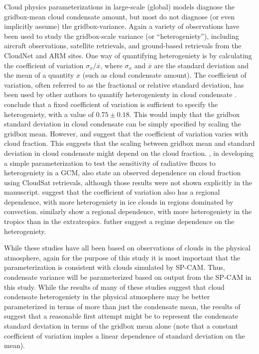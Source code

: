 Cloud physics parameterizations in large-scale (global) models diagnose
the gridbox-mean cloud condensate amount, but most do not diagnose (or
even implicitly assume) the gridbox-variance. Again a variety of
observations have been used to study the gridbox-scale variance (or
``heterogeniety''), including aircraft observations, satellite
retrievals, and ground-based retrievals from the CloudNet and ARM sites.
One way of quantifying heterogeniety is by calculating the coefficient
of variation \(\sigma_x / \overline{x}\), where \(\sigma_x\) and
\(\overline{x}\) are the standard deviation and the mean of a quantity
\(x\) (such as cloud condensate amount). The coefficient of variation,
often referred to as the fractional or relative standard deviation, has
been used by other authors to quantify heterogenienty in cloud
condensate
\citep{hogan_and_illingworth_2003, shonk_et_al_2010, hill_et_al_2012, boutle_et_al_2014}.
\citet{shonk_et_al_2010} conclude that a fixed coefficient of variation
is sufficient to specify the heterogeniety, with a value of
\(0.75 \pm 0.18\). This would imply that the gridbox standard deviation
in cloud condensate can be simply specified by scaling the gridbox mean.
However, \citet{hill_et_al_2012} and \citet{boutle_et_al_2014} suggest
that the coefficient of variation varies with cloud fraction. This
suggests that the scaling between gridbox mean and standard deviation in
cloud condensate might depend on the cloud fraction.
\citet{oreopoulos_et_al_2012}, in developing a simple parameterization
to test the sensitivity of radiative fluxes to heterogeniety in a GCM,
also state an observed dependence on cloud fraction using CloudSat
retrievals, although those results were not shown explicitly in the
manuscript. \citet{hill_et_al_2015} suggest that the coefficient of
variation also has a regional dependence, with more heterogeniety in ice
clouds in regions dominated by convection. \citet{lebsock_et_al_2013}
similarly show a regional dependence, with more heterogeniety in the
tropics than in the extratropics. \citet{ahlgrimm_and_forbes_2016}
futher suggest a regime dependence on the heterogeniety.

While these studies have all been based on observations of clouds in the
physical atmosphere, again for the purpose of this study it is most
important that the parameterization is consistent with clouds simulated
by SP-CAM. Thus, condensate variance will be parameterized based on
output from the SP-CAM in this study. While the results of many of these
studies suggest that cloud condensate heterogeniety in the physical
atmosphere may be better parameterized in terms of more than just the
condensate mean, the results of \citet{shonk_et_al_2010} suggest that a
reasonable first attempt might be to represent the condensate standard
deviation in terms of the gridbox mean alone (note that a constant
coefficient of variation imples a linear dependence of standard
deviation on the mean).


